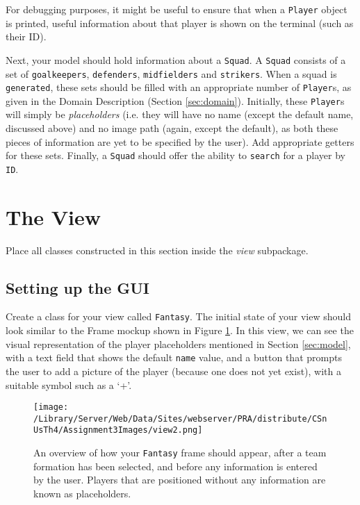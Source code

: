 \documentclass[11pt]{article}
\begin{document}
For debugging purposes, it might be useful to ensure that when a \texttt{Player} object is printed, useful information about that player is shown on the terminal (such as their ID). 

Next, your model should hold information about a \texttt{Squad}. A \texttt{Squad} consists of a set of \texttt{goalkeepers}, \texttt{defenders}, \texttt{midfielders} and \texttt{strikers}. When a squad is \texttt{generated}, these sets should be filled with an appropriate number of \texttt{Player}s, as given in the Domain Description (Section \ref{sec:domain}). Initially, these \texttt{Player}s will simply be \emph{placeholders} (i.e. they will have no name (except the default name, discussed above) and no image path (again, except the default), as both these pieces of information are yet to be specified by the user). Add appropriate getters for these sets. Finally, a \texttt{Squad} should offer the ability to \texttt{search} for a player by \texttt{ID}.

\section{The View}

Place all classes constructed in this section inside the \emph{view} subpackage.

\subsection{Setting up the GUI}
\label{sec:setting}

Create a class for your view called \texttt{Fantasy}. The initial state of your view should look similar to the Frame mockup shown in Figure \ref{fig:view2}. In this view, we can see the visual representation of the player placeholders mentioned in Section \ref{sec:model}, with a text field that shows the default \texttt{name} value, and a button that prompts the user to add a picture of the player (because one does not yet exist), with a suitable symbol such as a `+'.  

\begin{figure}[htbp]
\begin{center}
\texttt{[image: /Library/Server/Web/Data/Sites/webserver/PRA/distribute/CSnUsTh4/Assignment3Images/view2.png]}
\caption{An overview of how your \texttt{Fantasy} frame should appear, after a team formation has been selected, and before any information is entered by the user. Players that are positioned without any information are known as placeholders.}
\label{fig:view2}
\end{center}
\end{figure}
\end{document}
